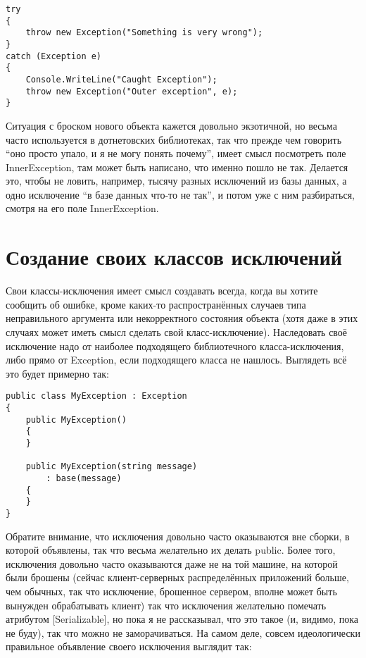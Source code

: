 \documentclass[a5paper]{article}
\begin{document}
\begin{verbatim}
try
{
    throw new Exception("Something is very wrong");
}
catch (Exception e)
{
    Console.WriteLine("Caught Exception");
    throw new Exception("Outer exception", e);
}
\end{verbatim}

Ситуация с броском нового объекта кажется довольно экзотичной, но весьма часто используется в дотнетовских библиотеках, так что прежде чем говорить ``оно просто упало, и я не могу понять почему'', имеет смысл посмотреть поле InnerException, там может быть написано, что именно пошло не так. Делается это, чтобы не ловить, например, тысячу разных исключений из базы данных, а одно исключение ``в базе данных что-то не так'', и потом уже с ним разбираться, смотря на его поле InnerException.

\section{Создание своих классов исключений}

Свои классы-исключения имеет смысл создавать всегда, когда вы хотите сообщить об ошибке, кроме каких-то распространённых случаев типа неправильного аргумента или некорректного состояния объекта (хотя даже в этих случаях может иметь смысл сделать свой класс-исключение). Наследовать своё исключение надо от наиболее подходящего библиотечного класса-исключения, либо прямо от Exception, если подходящего класса не нашлось. Выглядеть всё это будет примерно так:

\begin{verbatim}
public class MyException : Exception
{
    public MyException() 
    {
    }

    public MyException(string message)
        : base(message)
    {
    }
}
\end{verbatim}

Обратите внимание, что исключения довольно часто оказываются вне сборки, в которой объявлены, так что весьма желательно их делать public. Более того, исключения довольно часто оказываются даже не на той машине, на которой были брошены (сейчас клиент-серверных распределённых приложений больше, чем обычных, так что исключение, брошенное сервером, вполне может быть вынужден обрабатывать клиент) так что исключения желательно помечать атрибутом [Serializable], но пока я не рассказывал, что это такое (и, видимо, пока не буду), так что можно не заморачиваться. На самом деле, совсем идеологически правильное объявление своего исключения выглядит так:
\end{document}
